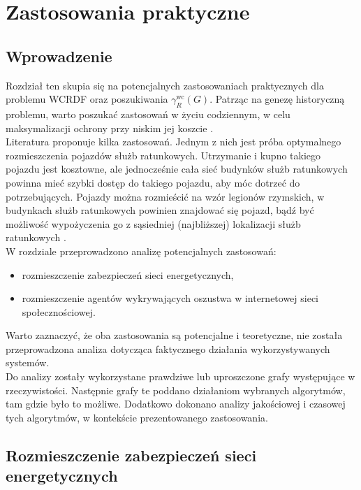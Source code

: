 \chapter{Zastosowania praktyczne}

\section{Wprowadzenie}

Rozdział ten skupia się na potencjalnych zastosowaniach praktycznych dla problemu WCRDF oraz poszukiwania $\gamma^{\text{wc}}_R(G)$. Patrząc na genezę historyczną problemu, warto poszukać zastosowań w życiu codziennym, w celu maksymalizacji ochrony przy niskim jej koszcie \cite{theoryWCRDF}.\\
Literatura proponuje kilka zastosowań. Jednym z nich jest próba optymalnego rozmieszczenia pojazdów służb ratunkowych. Utrzymanie i kupno takiego pojazdu jest kosztowne, ale jednocześnie cała sieć budynków służb ratunkowych powinna mieć szybki dostęp do takiego pojazdu, aby móc dotrzeć do potrzebujących. Pojazdy można rozmieścić na wzór legionów rzymskich, w budynkach służb ratunkowych powinien znajdować się pojazd, bądź być możliwość wypożyczenia go z sąsiedniej (najbliższej) lokalizacji służb ratunkowych \cite{improvedILP}.\\
W rozdziale przeprowadzono analizę potencjalnych zastosowań:
\begin{itemize}
    \item rozmieszczenie zabezpieczeń sieci energetycznych,
    \item rozmieszczenie agentów wykrywających oszustwa w internetowej sieci
    społecznościowej.
\end{itemize}
Warto zaznaczyć, że oba zastosowania są potencjalne i teoretyczne, nie została przeprowadzona analiza dotycząca faktycznego działania wykorzystywanych systemów.\\
Do analizy zostały wykorzystane prawdziwe lub uproszczone grafy występujące w rzeczywistości. Następnie grafy te poddano działaniom wybranych algorytmów, tam gdzie było to możliwe. Dodatkowo dokonano analizy jakościowej i czasowej tych algorytmów, w kontekście prezentowanego zastosowania.

\section{Rozmieszczenie zabezpieczeń sieci energetycznych}

